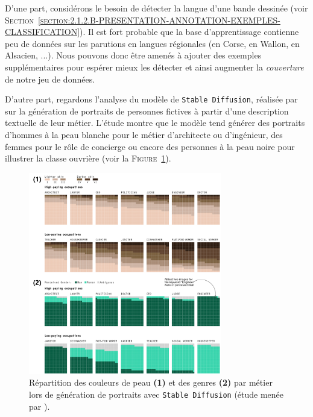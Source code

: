 			\begin{leftBarExamples}
				D'une part, considérons le besoin de détecter la langue d'une bande dessinée (voir \textsc{Section~\ref{section:2.1.2.B-PRESENTATION-ANNOTATION-EXEMPLES-CLASSIFICATION}}).
				Il est fort probable que la base d'apprentissage contienne peu de données sur les parutions en langues régionales (en Corse, en Wallon, en Alsacien, ...).
				Nous pouvons donc être amenés à ajouter des exemples supplémentaires pour espérer mieux les détecter et ainsi augmenter la \textit{couverture} de notre jeu de données.
				
				D'autre part, regardons l'analyse du modèle de \texttt{Stable Diffusion}, réalisée par \cite{nicoletti-bass:2023:generative-ai-takes} sur la génération de portraits de personnes fictives à partir d'une description textuelle de leur métier.
				L'étude montre que le modèle tend générer des portraits d'hommes à la peau blanche pour le métier d'architecte ou d'ingénieur, des femmes pour le rôle de concierge ou encore des personnes à la peau noire pour illustrer la classe ouvrière (voir la \textsc{Figure~\ref{figure:2.3.1.A-DEFIS-ANNOTATION-ASPECT-DONNEES-REPRESENTATIVITE-STEREOTYPES}}).
				\begin{figure}[H]
					\centering
					\includegraphics[width=0.75\textwidth]{figures/etatdelart-nicoletti-bass-2023}
					\caption{
						Répartition des couleurs de peau \textbf{(1)} et des genres \textbf{(2)} par métier lors de génération de portraits avec \texttt{Stable Diffusion} (étude menée par \cite{nicoletti-bass:2023:generative-ai-takes}).
					}
					\label{figure:2.3.1.A-DEFIS-ANNOTATION-ASPECT-DONNEES-REPRESENTATIVITE-STEREOTYPES}
				\end{figure}
				

\end{leftBarExamples}
